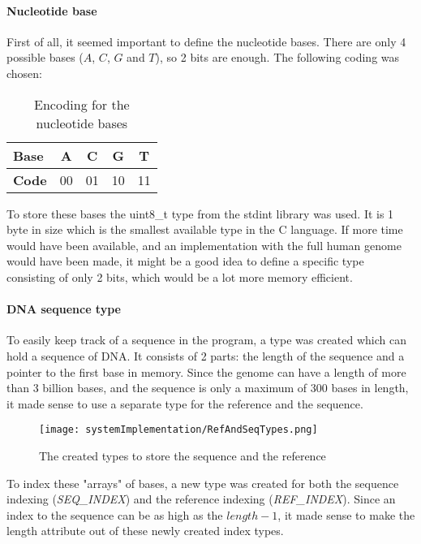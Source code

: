 \paragraph{Nucleotide base}
First of all, it seemed important to define the nucleotide bases. There are only 4 possible bases ($A$, $C$, $G$ and $T$), so 2 bits are enough. The following coding was chosen:

\begin{table}[H]
	\centering
	\begin{tabular}{|l|c|c|c|c|}
		\hline
		\textbf{Base} & A  & C  & G  & T  \\ \hline
		\textbf{Code} & 00 & 01 & 10 & 11 \\ \hline
	\end{tabular}
	\caption{\centering Encoding for the nucleotide bases}
\end{table}

To store these bases the uint8\_t type from the stdint library was used. It is 1 byte in size which is the smallest available type in the C language. If more time would have been available, and an implementation with the full human genome would have been made, it might be a good idea to define a specific type consisting of only 2 bits, which would be a lot more memory efficient.

\paragraph{DNA sequence type} To easily keep track of a sequence in the program, a type was created which can hold a sequence of DNA. It consists of 2 parts: the length of the sequence and a pointer to the first base in memory. 
Since the genome can have a length of more than 3 billion bases, and the sequence is only a maximum of 300 bases in length, it made sense to use a separate type for the reference and the sequence.\\

\begin{figure}[H]
	\centering
	\texttt{[image: systemImplementation/RefAndSeqTypes.png]}
	\caption{The created types to store the sequence and the reference}
	\label{fig:RefAndSeqTypes}
\end{figure}

To index these "arrays" of bases, a new type was created for both the sequence indexing (\emph{SEQ\_INDEX}) and the reference indexing (\emph{REF\_INDEX}). Since an index to the sequence can be as high as the $length - 1$, it made sense to make the length attribute out of these newly created index types.


